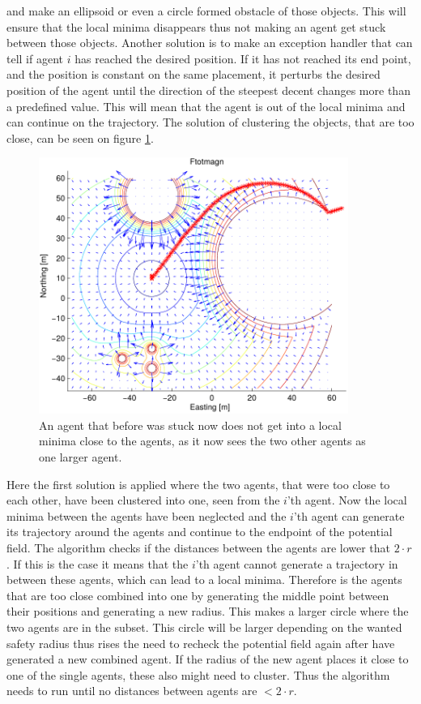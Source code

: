 and make an ellipsoid or even a circle formed obstacle of those
objects. This will ensure that the local minima disappears thus not
making an agent get stuck between those objects. Another solution is
to make an exception handler that can tell if agent $i$ has reached
the desired position. If it has not reached its end point, and the
position is constant on the same placement, it perturbs the desired
position of the agent until the direction of the steepest decent
changes more than a predefined value. This will mean that the agent is out of the local minima and can continue on the trajectory.
The solution of clustering the objects, that are too close, can be seen on figure \ref{fig:solroevproblem}.
\begin{figure}[htbp]
  \includegraphics[width=0.9\textwidth]{fig/ftotmagnfigpdf4}
  \caption{An agent that before was stuck now does not get into a local minima close to the agents, as it now sees the two other agents as one larger agent.}
  \label{fig:solroevproblem}
\end{figure}
Here the first solution is applied where the two agents, that were too close to each other, have been clustered into one, seen from the $i$'th agent. Now the local minima between the agents have been neglected and the $i$'th agent can generate its trajectory around the agents and continue to the endpoint of the potential field. The algorithm checks if the distances between the agents are lower that $2 \cdot r$. If this is the case it means that the $i$'th agent cannot generate a trajectory in between these agents, which can lead to a local minima. Therefore is the agents that are too close combined into one by generating the middle point between their positions and generating a new radius. This makes a larger circle where the two agents are in the subset. This circle will be larger depending on the wanted safety radius thus rises the need to recheck the potential field again after have generated a new combined agent. If the radius of the new agent places it close to one of the single agents, these also might need to cluster. Thus the algorithm needs to run until no distances between agents are $< 2 \cdot r$.
